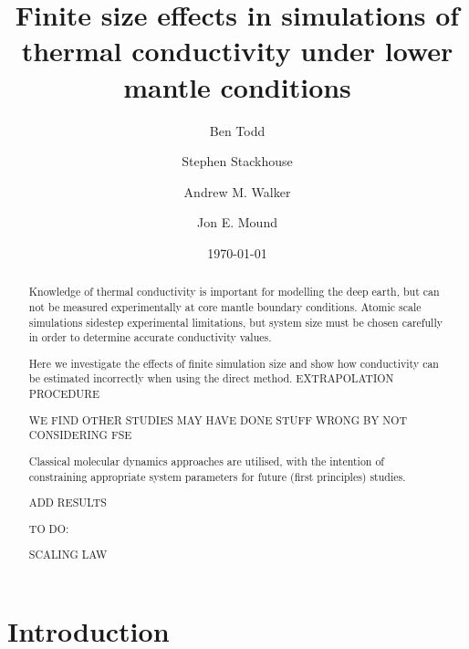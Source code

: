 \documentclass[%
preprint,                                  %
nofootinbib,
 amsmath,amssymb,
 aps,
]{revtex4-1}
\begin{document}
\newcommand{\wmk}{Wm$^{-1}$K$^{-1}$}


\title{Finite size effects in simulations of thermal conductivity under lower mantle conditions}%

\author{Ben Todd}
\author{Stephen Stackhouse}
\author{Andrew M. Walker}
\author{Jon E. Mound}


\date{\today}%

\begin{abstract}

Knowledge of thermal conductivity is important for modelling the deep earth, but can not be measured experimentally at core mantle boundary conditions. Atomic scale simulations sidestep experimental limitations, but system size must be chosen carefully in order to determine accurate conductivity values.

Here we investigate the effects of finite simulation size and show how conductivity can be estimated incorrectly when using the direct method. EXTRAPOLATION PROCEDURE

WE FIND OTHER STUDIES MAY HAVE DONE STUFF WRONG BY NOT CONSIDERING FSE

Classical molecular dynamics approaches are utilised, with the intention of constraining appropriate system parameters for future (first principles) studies.

ADD RESULTS

TO DO:

SCALING LAW

\end{abstract}

\maketitle




\section{\label{sec:intro}Introduction}
\end{document}
